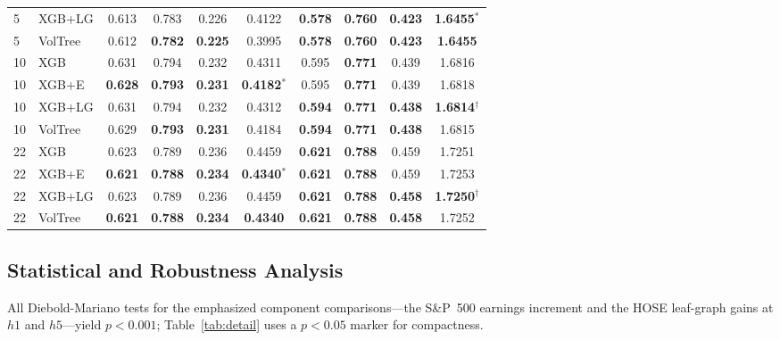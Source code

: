 \documentclass[runningheads,a4paper]{llncs}
\begin{document}
\begin{table}[!t]
\begin{tabular}{ll cccc cccc}
5 & XGB+LG   & 0.613 & 0.783 & 0.226 & 0.4122 & \textbf{0.578} & \textbf{0.760} & \textbf{0.423} & \textbf{1.6455$^{*}$} \\
5 & VolTree  & 0.612 & \textbf{0.782} & \textbf{0.225} & 0.3995 & \textbf{0.578} & \textbf{0.760} & \textbf{0.423} & \textbf{1.6455} \\
\midrule
10 & XGB      & 0.631 & 0.794 & 0.232 & 0.4311 & 0.595 & \textbf{0.771} & 0.439 & 1.6816 \\
10 & XGB+E    & \textbf{0.628} & \textbf{0.793} & \textbf{0.231} & \textbf{0.4182$^{*}$} & 0.595 & \textbf{0.771} & 0.439 & 1.6818 \\
10 & XGB+LG   & 0.631 & 0.794 & 0.232 & 0.4312 & \textbf{0.594} & \textbf{0.771} & \textbf{0.438} & \textbf{1.6814$^{\dagger}$} \\
10 & VolTree  & 0.629 & \textbf{0.793} & \textbf{0.231} & 0.4184 & \textbf{0.594} & \textbf{0.771} & \textbf{0.438} & 1.6815 \\
\midrule
22 & XGB      & 0.623 & 0.789 & 0.236 & 0.4459 & \textbf{0.621} & \textbf{0.788} & 0.459 & 1.7251 \\
22 & XGB+E    & \textbf{0.621} & \textbf{0.788} & \textbf{0.234} & \textbf{0.4340$^{*}$} & \textbf{0.621} & \textbf{0.788} & 0.459 & 1.7253 \\
22 & XGB+LG   & 0.623 & 0.789 & 0.236 & 0.4459 & \textbf{0.621} & \textbf{0.788} & \textbf{0.458} & \textbf{1.7250$^{\dagger}$} \\
22 & VolTree  & \textbf{0.621} & \textbf{0.788} & \textbf{0.234} & \textbf{0.4340} & \textbf{0.621} & \textbf{0.788} & \textbf{0.458} & 1.7252 \\
\bottomrule
\end{tabular}
\end{table}

\subsection{Statistical and Robustness Analysis}\label{sec:robust}
All Diebold-Mariano tests for the emphasized component comparisons---the S\&P~500 earnings increment and
the HOSE leaf-graph gains at $h1$ and $h5$---yield $p<0.001$; Table~\ref{tab:detail} uses a $p<0.05$ marker
for compactness.
\end{document}

